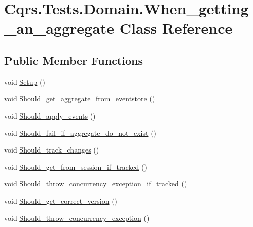 \hypertarget{classCqrs_1_1Tests_1_1Domain_1_1When__getting__an__aggregate}{}\section{Cqrs.\+Tests.\+Domain.\+When\+\_\+getting\+\_\+an\+\_\+aggregate Class Reference}
\label{classCqrs_1_1Tests_1_1Domain_1_1When__getting__an__aggregate}
\subsection*{Public Member Functions}
\begin{DoxyCompactItemize}
\item 
void \hyperlink{classCqrs_1_1Tests_1_1Domain_1_1When__getting__an__aggregate_a17e6e5fee963f1be91d116e16f010fdb_a17e6e5fee963f1be91d116e16f010fdb}{Setup} ()
\item 
void \hyperlink{classCqrs_1_1Tests_1_1Domain_1_1When__getting__an__aggregate_a8567c3c63d43386e34601e2f760fdea6_a8567c3c63d43386e34601e2f760fdea6}{Should\+\_\+get\+\_\+aggregate\+\_\+from\+\_\+eventstore} ()
\item 
void \hyperlink{classCqrs_1_1Tests_1_1Domain_1_1When__getting__an__aggregate_a7dac44c94e1139f61b9689d8ef57f924_a7dac44c94e1139f61b9689d8ef57f924}{Should\+\_\+apply\+\_\+events} ()
\item 
void \hyperlink{classCqrs_1_1Tests_1_1Domain_1_1When__getting__an__aggregate_abffb22b1af3fdb7005cd27477aaa8b03_abffb22b1af3fdb7005cd27477aaa8b03}{Should\+\_\+fail\+\_\+if\+\_\+aggregate\+\_\+do\+\_\+not\+\_\+exist} ()
\item 
void \hyperlink{classCqrs_1_1Tests_1_1Domain_1_1When__getting__an__aggregate_a6dc0bedf2d67b0a6bc84afa023815464_a6dc0bedf2d67b0a6bc84afa023815464}{Should\+\_\+track\+\_\+changes} ()
\item 
void \hyperlink{classCqrs_1_1Tests_1_1Domain_1_1When__getting__an__aggregate_ab19bbe152359e6370a1395f71aea851b_ab19bbe152359e6370a1395f71aea851b}{Should\+\_\+get\+\_\+from\+\_\+session\+\_\+if\+\_\+tracked} ()
\item 
void \hyperlink{classCqrs_1_1Tests_1_1Domain_1_1When__getting__an__aggregate_a82cc413f6fb26f7b47dc274dc01dbcf3_a82cc413f6fb26f7b47dc274dc01dbcf3}{Should\+\_\+throw\+\_\+concurrency\+\_\+exception\+\_\+if\+\_\+tracked} ()
\item 
void \hyperlink{classCqrs_1_1Tests_1_1Domain_1_1When__getting__an__aggregate_a6160a2d5764a545d0bbd1ad084fa3a4e_a6160a2d5764a545d0bbd1ad084fa3a4e}{Should\+\_\+get\+\_\+correct\+\_\+version} ()
\item 
void \hyperlink{classCqrs_1_1Tests_1_1Domain_1_1When__getting__an__aggregate_a855326fe351727f2aa5550de24f553ab_a855326fe351727f2aa5550de24f553ab}{Should\+\_\+throw\+\_\+concurrency\+\_\+exception} ()
\end{DoxyCompactItemize}


